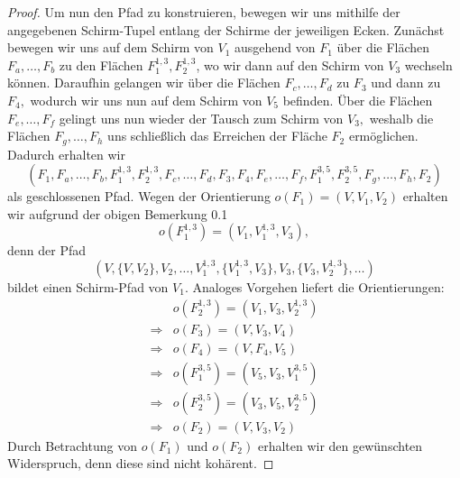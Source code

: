 \documentclass[12pt,titlepage,twoside,cleardoublepage]{article}
\theoremstyle{nummermitklammern}
\numberwithin{equation}{section}
\begin{document}
\begin{proof}
Um nun den Pfad zu konstruieren, bewegen wir uns mithilfe der angegebenen Schirm-Tupel entlang der Schirme der jeweiligen Ecken. Zunächst bewegen wir uns auf dem Schirm von $V_1$ ausgehend von $F_1$ über die Flächen $F_a,\ldots,F_b$ zu den Flächen $F_1^{1,3},F_2^{1,3}$, wo wir dann auf den Schirm von $V_3$ wechseln können. Daraufhin gelangen wir über die Flächen $F_c,\ldots,F_d$ zu $F_3$ und dann zu $F_4,$ wodurch wir uns nun auf dem Schirm von $V_5$ befinden. Über die Flächen $F_e,\ldots,F_f$ gelingt uns nun wieder der Tausch zum Schirm von $V_3,$ weshalb die Flächen $F_g,\ldots,F_h$ uns schließlich das Erreichen der Fläche $F_2$ ermöglichen.  
Dadurch erhalten wir 
\[
(F_1,F_a,\ldots,F_b,F^{1,3}_1,F^{1,3}_2,F_c,\ldots,F_d,F_3,F_4,F_e,\ldots,F_f,F_1^{3,5},F_2^{3,5},F_g,\ldots,F_h,F_2)
\]
als geschlossenen Pfad.
Wegen der Orientierung $o(F_1)=(V,V_1,V_2)$ erhalten wir aufgrund der obigen Bemerkung 0.1
\[
o(F_1^{1,3})=(V_1,V_1^{1,3},V_3),
\] 
denn der Pfad 
\[
(V,\{V,V_2\},V_2,\ldots, V_1^{1,3},\{V_1^{1,3},V_3\},V_3,\{V_3,V_2^{1,3}\},\ldots)
\] bildet einen Schirm-Pfad von $V_1.$
Analoges Vorgehen liefert die Orientierungen:
\begin{align*}
&o(F_2^{1,3})=(V_1,V_3,V_2^{1,3})\\
\Rightarrow&o(F_3)=(V,V_3,V_4)\\
\Rightarrow&o(F_4)=(V,F_4,V_5)\\
\Rightarrow&o(F_1^{3,5})=(V_5,V_3,V_1^{3,5})\\
\Rightarrow&o(F_2^{3,5})=(V_3,V_5,V_2^{3,5})\\
\Rightarrow&o(F_2)=(V,V_3,V_2)
\end{align*}
Durch Betrachtung von $o(F_1)$ und $o(F_2)$ erhalten wir den gewünschten Widerspruch, denn diese sind nicht kohärent.
\end{proof}
\end{document}
